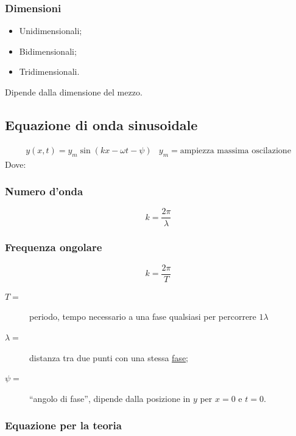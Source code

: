 \documentclass{book}
\begin{document}
\subsubsection{Dimensioni}
\label{sec:ondim}
\begin{itemize}
\item Unidimensionali;
\item Bidimensionali;
\item Tridimensionali.
\end{itemize}
Dipende dalla dimensione del mezzo.

\subsection{Equazione di onda sinusoidale}
\label{sec:eqsin}
\begin{eqnarray}
  \label{eq:eqsin}
  y(x,t)=y_m\sin(kx-\omega t -\psi) & y_m=\text{ampiezza massima oscilazione}
\end{eqnarray}
Dove:
\begin{multicols}{2}
  \subsubsection{Numero d'onda}
  \label{sec:nonda}
  
  \begin{equation}
    \label{eq:nonda}
    k=\frac{2\pi}{\lambda}
  \end{equation}
  
  \subsubsection{Frequenza ongolare}
  \label{sec:fdonda}
  \begin{equation}
    \label{eq:fdonda}
    k=\frac{2\pi}{T}
  \end{equation}  
\end{multicols}
\begin{description}
\item[$T=$] periodo, tempo necessario a una fase qualsiasi per percorrere $1\lambda$
\item[$\lambda=$] distanza tra due punti con una stessa \underline{fase};
\item[$\psi=$] ``angolo di fase'', dipende dalla posizione in $y$ per $x=0$ e $t=0$.
\end{description}

\subsubsection{Equazione per la teoria}
\label{sec:teoonde}
\end{document}
